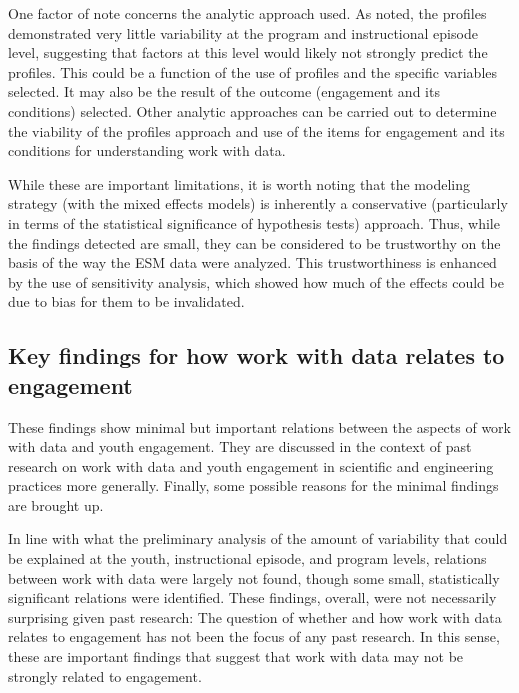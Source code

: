 \documentclass[]{msu-thesis}
\theoremstyle{definition}
\theoremstyle{definition}
\theoremstyle{definition}
\theoremstyle{remark}
\begin{document}
One factor of note concerns the analytic approach used. As noted, the
profiles demonstrated very little variability at the program and
instructional episode level, suggesting that factors at this level would
likely not strongly predict the profiles. This could be a function of
the use of profiles and the specific variables selected. It may also be
the result of the outcome (engagement and its conditions) selected.
Other analytic approaches can be carried out to determine the viability
of the profiles approach and use of the items for engagement and its
conditions for understanding work with data.

While these are important limitations, it is worth noting that the
modeling strategy (with the mixed effects models) is inherently a
conservative (particularly in terms of the statistical significance of
hypothesis tests) approach. Thus, while the findings detected are small,
they can be considered to be trustworthy on the basis of the way the ESM
data were analyzed. This trustworthiness is enhanced by the use of
sensitivity analysis, which showed how much of the effects could be due
to bias for them to be invalidated.

\subsection{Key findings for how work with data relates to
engagement}\label{key-findings-for-how-work-with-data-relates-to-engagement}

These findings show minimal but important relations between the aspects
of work with data and youth engagement. They are discussed in the
context of past research on work with data and youth engagement in
scientific and engineering practices more generally. Finally, some
possible reasons for the minimal findings are brought up.

In line with what the preliminary analysis of the amount of variability
that could be explained at the youth, instructional episode, and program
levels, relations between work with data were largely not found, though
some small, statistically significant relations were identified. These
findings, overall, were not necessarily surprising given past research:
The question of whether and how work with data relates to engagement has
not been the focus of any past research. In this sense, these are
important findings that suggest that work with data may not be strongly
related to engagement.
\end{document}
